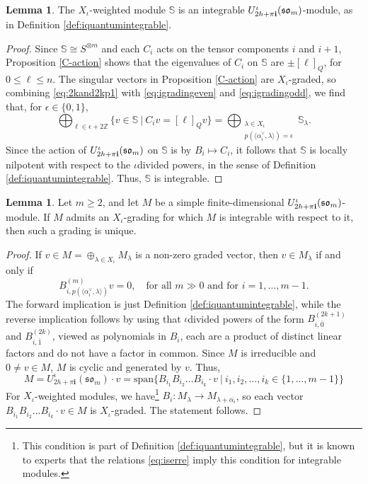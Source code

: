\documentclass[10pt]{amsart}
\numberwithin{equation}{section}
\theoremstyle{definition}
\newtheorem{lemma}[theorem]{Lemma}
\newcommand{\som}[1][m]{\mathfrak{so}_{#1}}
\newcommand{\imag}{\textbf{i}}
\newcommand{\howespin}{\boldsymbol{\mathbb{S}}}
\begin{document}
\begin{lemma}
    The $X_{\iota}$-weighted module $\howespin$ is an integrable $U_{2h+\pi {\bf i}}^\iota (\som)$-module, as in Definition \ref{def:iquantumintegrable}.
\end{lemma}  
\begin{proof}
    Since $\howespin\cong S^{\otimes m}$ and each $C_i$ acts on the tensor components $i$ and $i+1$, Proposition \ref{C-action} shows that the eigenvalues of $C_i$ on $\howespin$ are $\pm [\ell]_Q$, for $0\le \ell\le n$. The singular vectors in Proposition \ref{C-action} are $X_{\iota}$-graded, so combining \eqref{eq:2kand2kp1} with \eqref{eq:igradingeven} and \eqref{eq:igradingodd}, we find that, for $\epsilon \in \{0,1\}$,
    \[
    \bigoplus_{\ell \in \epsilon + 2\mathbb{Z}}\{v\in \howespin \ | \ C_iv=[\ell]_{Q}v\} = \bigoplus_{\substack{\lambda \in X_{\iota} \\ p(\langle\alpha_i^{\vee}, \lambda\rangle)= \epsilon}}\howespin_{\lambda}.
    \]
    Since the action of $U_{2h+\pi {\bf i}}^\iota (\som)$ on $\howespin$ is by $B_i\mapsto C_i$, it follows that $\howespin$ is locally nilpotent with respect to the $\iota$divided powers, in the sense of Definition \ref{def:iquantumintegrable}. Thus, $\howespin$ is integrable. 
\end{proof}

\begin{lemma}\label{grading}
    Let $m\ge 2$, and let $M$ be a simple finite-dimensional $U^\iota_{2h+\pi{\bf i}}(\som)$-module. If $M$ admits an $X_{\iota}$-grading for which $M$ is integrable with respect to it, then such a grading is unique.
\end{lemma}
\begin{proof}
    If $v\in M=\oplus_{\lambda\in X_{\iota}}M_{\lambda}$ is a non-zero graded vector, then $v\in M_{\lambda}$ if and only if
    \[
    B_{i,p(\langle \alpha_i^{\vee},\lambda \rangle)}^{(m)}v=0, \quad \text{for all $m\gg 0$ and for $i=1, \dots, m-1$.}
    \]
    The forward implication is just Definition \ref{def:iquantumintegrable}, while the reverse implication follows by using that $\iota$divided powers of the form $B_{i,\overline{0}}^{(2k+1)}$ and $B_{i,\overline{1}}^{(2k)}$, viewed as polynomials in $B_i$, each are a product of distinct linear factors and do not have a factor in common. Since $M$ is irreducible and $0\ne v\in M$, $M$ is cyclic and generated by $v$. Thus, 
    \[
    M = U_{2h+\pi\imag}^{\iota}(\som)\cdot v = \mathrm{span}\{B_{i_1}B_{i_2}\dots B_{i_k}\cdot v \ | \ i_1, i_2, \dots, i_k\in \{1, \dots, m-1\}\}
    \]
    For $X_{\iota}$-weighted modules, we have\footnote{This condition is part of Definition \ref{def:iquantumintegrable}, but it is known to experts that the relations \eqref{eq:iserre} imply this condition for integrable modules.} $B_i:M_{\lambda}\rightarrow M_{\lambda + \overline{\alpha_i}}$, so each vector $B_{i_1}B_{i_2}\dots B_{i_k}\cdot v\in M$ is $X_{\iota}$-graded. The statement follows.
\end{proof}
\end{document}
